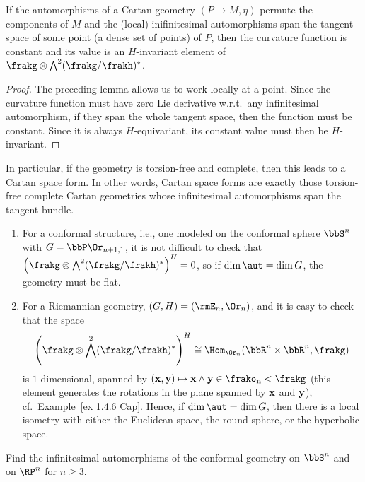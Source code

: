 \begin{cor}
    If the automorphisms of a Cartan geometry $(P\to M,\eta)$ permute the components of $M$ and the (local) inifinitesimal automorphisms span the tangent space of some point (a dense set of points) of $P$, then the curvature function is constant and its value is an $H$-invariant element of $\frakg\otimes \bigwedge^2(\frakg\slash\frakh)^\ast$.
\end{cor}
\begin{proof}
    The preceding lemma allows us to work locally at a point. Since the curvature function must have zero Lie derivative w.r.t.\ any infinitesimal automorphism, if they span the whole tangent space, then the function must be constant. Since it is always $H$-equivariant, its constant value must then be $H$-invariant.
\end{proof}

In particular, if the geometry is torsion-free and complete, then this leads to a Cartan space form. In other words, Cartan space forms are exactly those torsion-free complete Cartan geometries whose infinitesimal automorphisms span the tangent bundle.

\begin{example}
    \begin{enumerate}
        \item For a conformal structure, i.e., one modeled on the conformal sphere $\bbS^n$ with $G=\bbP \Or_{n+1,1}$, it is not difficult to check that $\left(\frakg\otimes \bigwedge^2(\frakg\slash\frakh)^\ast\right)^H=0$, so if $\dim \aut=\dim G$, the geometry must be flat.
        \item For a Riemannian geometry, $(G,H)=(\rmE_n,\Or_n)$, and it is easy to check that the space 
        \[\left(\frakg\otimes \bigwedge^2(\frakg\slash\frakh)^\ast\right)^H\cong \Hom_{\Or_n}(\bbR^n\times\bbR^n,\frakg)\] 
        is $1$-dimensional, spanned by $(\bf{x},\bf{y})\mapsto \bf{x}\wedge\bf{y}\in\frako_n<\frakg$ (this element generates the rotations in the plane spanned by $\bf{x}$ and $\bf{y}$), cf.\ Example~\ref{ex 1.4.6 Cap}. Hence, if $\dim \aut=\dim G$, then there is a local isometry with either the Euclidean space, the round sphere, or the hyperbolic space.
    \end{enumerate}
\end{example}

\begin{xca}
    Find the infinitesimal automorphisms of the conformal geometry on $\bbS^n$ and on $\RP^n$ for $n\geq 3$.
\end{xca}



